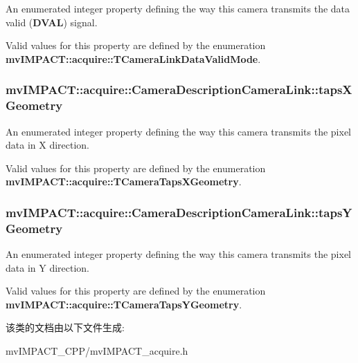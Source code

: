 An enumerated integer property defining the way this camera transmits the data valid ({\bfseries D\+V\+A\+L}) signal. 

Valid values for this property are defined by the enumeration {\bfseries mv\+I\+M\+P\+A\+C\+T\+::acquire\+::\+T\+Camera\+Link\+Data\+Valid\+Mode}. \hypertarget{classmv_i_m_p_a_c_t_1_1acquire_1_1_camera_description_camera_link_ae00a43dc132c45342054a60f1535c086}{
\subsubsection[{taps\+X\+Geometry}]{ mv\+I\+M\+P\+A\+C\+T\+::acquire\+::\+Camera\+Description\+Camera\+Link\+::taps\+X\+Geometry}}\label{classmv_i_m_p_a_c_t_1_1acquire_1_1_camera_description_camera_link_ae00a43dc132c45342054a60f1535c086}


An enumerated integer property defining the way this camera transmits the pixel data in X direction. 

Valid values for this property are defined by the enumeration {\bfseries mv\+I\+M\+P\+A\+C\+T\+::acquire\+::\+T\+Camera\+Taps\+X\+Geometry}. \hypertarget{classmv_i_m_p_a_c_t_1_1acquire_1_1_camera_description_camera_link_a284e7283b6a82c2fa44a22f90a85ce7e}{
\subsubsection[{taps\+Y\+Geometry}]{ mv\+I\+M\+P\+A\+C\+T\+::acquire\+::\+Camera\+Description\+Camera\+Link\+::taps\+Y\+Geometry}}\label{classmv_i_m_p_a_c_t_1_1acquire_1_1_camera_description_camera_link_a284e7283b6a82c2fa44a22f90a85ce7e}


An enumerated integer property defining the way this camera transmits the pixel data in Y direction. 

Valid values for this property are defined by the enumeration {\bfseries mv\+I\+M\+P\+A\+C\+T\+::acquire\+::\+T\+Camera\+Taps\+Y\+Geometry}. 

该类的文档由以下文件生成\+:\begin{DoxyCompactItemize}
\item 
mv\+I\+M\+P\+A\+C\+T\+\_\+\+C\+P\+P/mv\+I\+M\+P\+A\+C\+T\+\_\+acquire.\+h\end{DoxyCompactItemize}
